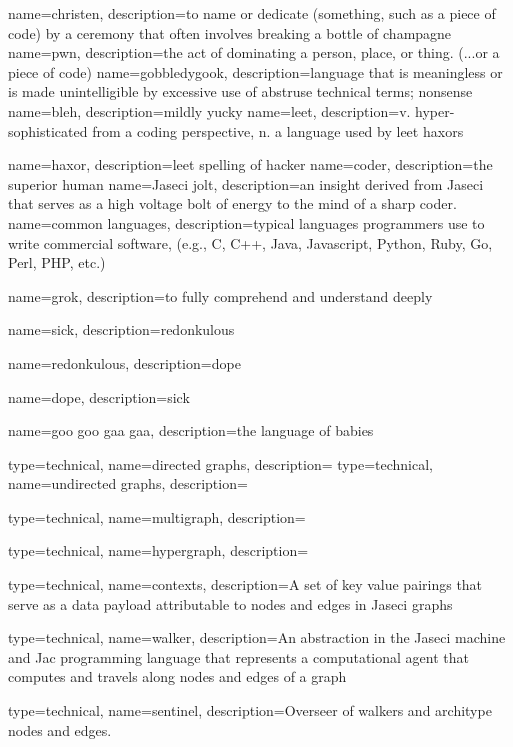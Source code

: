 {
    name=christen,
    description={to name or dedicate (something, such as a piece of code) by a ceremony that often involves breaking a bottle of champagne}
}
{
    name=pwn,
    description={the act of dominating a person, place, or thing. (...or a piece of code)}
}
{
    name=gobbledygook,
    description={language that is meaningless or is made unintelligible by excessive use of abstruse technical terms; nonsense}
}
{
    name=bleh,
    description={mildly yucky}
}
{
    name=leet,
    description={v. hyper-sophisticated from a coding perspective, n. a language used by \gls{leet} \gls{haxor}s}
}

{
    name=haxor,
    description={\gls{leet} spelling of hacker}
}
{
    name=coder,
    description={the superior human}
}
{
    name=Jaseci jolt,
    description={an insight derived from Jaseci that serves as a high voltage bolt of energy to the mind of a sharp coder.}
}
{
    name=common languages,
    description={typical languages programmers use to write commercial software, (e.g., C, C++, Java, Javascript, Python, Ruby, Go, Perl, PHP, etc.)}
}

{
    name=grok,
    description={to fully comprehend and understand deeply }
}

{
    name=sick,
    description={\gls{redonkulous}}
}

{
    name=redonkulous,
    description={\gls{dope}}
}

{
    name=dope,
    description={\gls{sick}}
}

{
    name=goo goo gaa gaa,
    description={the language of babies}
}

{
    type=technical,
    name=directed graphs,
    description={}
}
{
    type=technical,
    name=undirected graphs,
    description={}
}

{
    type=technical,
    name=multigraph,
    description={}
}

{
    type=technical,
    name=hypergraph,
    description={}
}

{
    type=technical,
    name=contexts,
    description={A set of key value pairings that serve as a data payload attributable to nodes and edges in Jaseci graphs}
}

{
    type=technical,
    name=walker,
    description={An abstraction in the Jaseci machine and Jac programming language that represents a computational agent that computes and travels along nodes and edges of a graph}
}

{
    type=technical,
    name=sentinel,
    description={Overseer of walkers and architype nodes and edges.}
}
